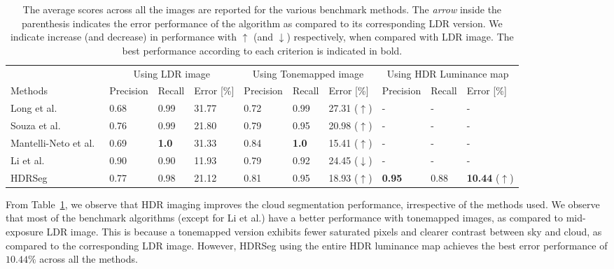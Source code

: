 \begin{table}[htb] %
\footnotesize
\begin{center} %
\begin{tabular}{p{2.2cm}|p{1cm}p{1cm}p{1cm}|p{1cm}p{1cm}p{1.5cm}|p{1cm}p{1cm}p{1.5cm}}
& \multicolumn{3}{c}{Using LDR image} & \multicolumn{3}{c}{Using Tonemapped image} 
			& \multicolumn{3}{c}{Using HDR Luminance map} \\
Methods & \scriptsize{Precision} & \scriptsize{Recall} & \scriptsize{Error [\%]} & \scriptsize{Precision} & \scriptsize{Recall} & \scriptsize{Error [\%]} & \scriptsize{Precision} & \scriptsize{Recall} & \scriptsize{Error [\%]}\\
\hline
Long et al.\ & 0.68 & 0.99 & 31.77 & 0.72 & 0.99 & 27.31 ($\uparrow$) & - & - & -\\
Souza et al.\ & 0.76 & 0.99 & 21.80 & 0.79 & 0.95 & 20.98 ($\uparrow$) & - & - & -\\
Mantelli-Neto et al.\ & 0.69 & \textbf{1.0} & 31.33 & 0.84 & \textbf{1.0} & 15.41 ($\uparrow$) & - & - & -\\
Li et al.\ & 0.90 & 0.90 & 11.93 & 0.79 & 0.92 & 24.45 ($\downarrow$) & - & - & -\\
HDRSeg & 0.77 & 0.98 & 21.12 & 0.81 & 0.95 & 18.93 ($\uparrow$) & \textbf{0.95} & 0.88 & \textbf{10.44} ($\uparrow$) \\
\hline
\end{tabular}
\caption[Comparison of HDRSeg segmentation algorithms with other benchmarking algorithms.]{The average scores across all the images are reported for the various benchmark methods. The \emph{arrow} inside the parenthesis indicates the error performance of the algorithm as compared to its corresponding LDR version. We indicate increase (and decrease) in performance with $\uparrow$ (and $\downarrow$) respectively, when compared with LDR image. The best performance according to each criterion is indicated in bold.} %
\label{tab:scores}
\end{center}
\end{table}


From Table~\ref{tab:scores}, we observe that HDR imaging improves the cloud segmentation performance, irrespective of the methods used. We observe that most of the benchmark algorithms (except for Li et al.) have a better performance with tonemapped images, as compared to mid-exposure LDR image. This is because a tonemapped version exhibits fewer saturated pixels and clearer contrast between sky and cloud, as compared to the corresponding LDR image. However, HDRSeg using the entire HDR luminance map achieves the best error performance of $10.44 \%$ across all the methods.

